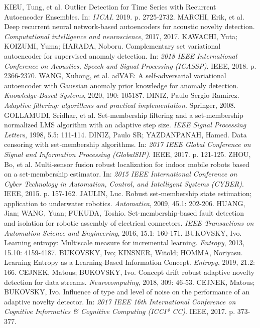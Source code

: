 \documentclass[11pt,twoside,openright]{report}
\begin{document}
\begin{thebibliography}{L}
KIEU, Tung, et al. Outlier Detection for Time Series with Recurrent Autoencoder Ensembles. In: \textit{IJCAI}. 2019. p. 2725-2732.
MARCHI, Erik, et al. Deep recurrent neural network-based autoencoders for acoustic novelty detection. \textit{Computational intelligence and neuroscience}, 2017, 2017.
KAWACHI, Yuta; KOIZUMI, Yuma; HARADA, Noboru. Complementary set variational autoencoder for supervised anomaly detection. In: \textit{2018 IEEE International Conference on Acoustics, Speech and Signal Processing (ICASSP)}. IEEE, 2018. p. 2366-2370.
WANG, Xuhong, et al. adVAE: A self-adversarial variational autoencoder with Gaussian anomaly prior knowledge for anomaly detection. \textit{Knowledge-Based Systems}, 2020, 190: 105187.
DINIZ, Paulo Sergio Ramirez. \textit{Adaptive filtering: algorithms and practical implementation}. Springer, 2008.
GOLLAMUDI, Sridhar, et al. Set-membership filtering and a set-membership normalized LMS algorithm with an adaptive step size. \textit{IEEE Signal Processing Letters}, 1998, 5.5: 111-114.
DINIZ, Paulo SR; YAZDANPANAH, Hamed. Data censoring with set-membership algorithms. In: \textit{2017 IEEE Global Conference on Signal and Information Processing (GlobalSIP)}. IEEE, 2017. p. 121-125.
ZHOU, Bo, et al. Multi-sensor fusion robust localization for indoor mobile robots based on a set-membership estimator. In: \textit{2015 IEEE International Conference on Cyber Technology in Automation, Control, and Intelligent Systems (CYBER)}. IEEE, 2015. p. 157-162.
JAULIN, Luc. Robust set-membership state estimation; application to underwater robotics. \textit{Automatica}, 2009, 45.1: 202-206.
HUANG, Jian; WANG, Yuan; FUKUDA, Toshio. Set-membership-based fault detection and isolation for robotic assembly of electrical connectors. \textit{IEEE Transactions on Automation Science and Engineering}, 2016, 15.1: 160-171.
BUKOVSKY, Ivo. Learning entropy: Multiscale measure for incremental learning. \textit{Entropy}, 2013, 15.10: 4159-4187.
BUKOVSKY, Ivo; KINSNER, Witold; HOMMA, Noriyasu. Learning Entropy as a Learning-Based Information Concept. \textit{Entropy}, 2019, 21.2: 166.
CEJNEK, Matous; BUKOVSKY, Ivo. Concept drift robust adaptive novelty detection for data streams. \textit{Neurocomputing}, 2018, 309: 46-53.
 CEJNEK, Matous; BUKOVSKY, Ivo. Influence of type and level of noise on the performance of an adaptive novelty detector. In: \textit{2017 IEEE 16th International Conference on Cognitive Informatics \& Cognitive Computing (ICCI* CC)}. IEEE, 2017. p. 373-377.

\end{thebibliography}
\end{document}
